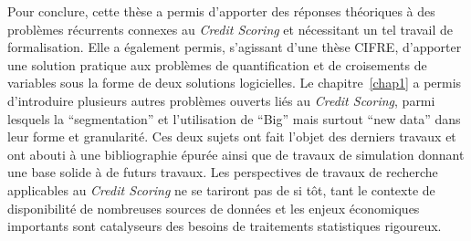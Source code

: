 \medskip

Pour conclure, cette thèse a permis d'apporter des réponses théoriques à des problèmes récurrents connexes au \textit{Credit Scoring} et nécessitant un tel travail de formalisation. Elle a également permis, s'agissant d'une thèse CIFRE, d'apporter une solution pratique aux problèmes de quantification et de croisements de variables sous la forme de deux solutions logicielles. Le chapitre~\ref{chap1} a permis d'introduire plusieurs autres problèmes ouverts liés au \textit{Credit Scoring}, parmi lesquels la ``segmentation'' et l'utilisation de ``Big'' mais surtout ``new data'' dans leur forme et granularité. Ces deux sujets ont fait l'objet des derniers travaux et ont abouti à une bibliographie épurée ainsi que de travaux de simulation donnant une base solide à de futurs travaux. Les perspectives de travaux de recherche applicables au \textit{Credit Scoring} ne se tariront pas de si tôt, tant le contexte de disponibilité de nombreuses sources de données et les enjeux économiques importants sont catalyseurs des besoins de traitements statistiques rigoureux.

\printbibliography[heading=subbibliography, title=Références de la conclusion]